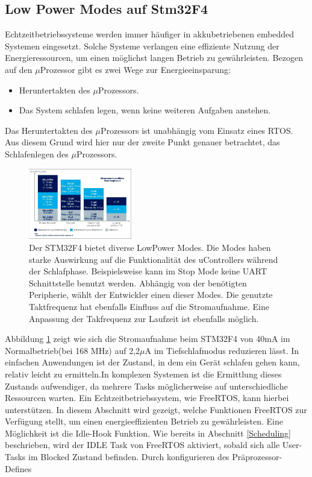 \subsection{Low Power Modes auf Stm32F4}
\label{sec:Low Power Modes}
Echtzeitbetriebssysteme werden immer häufiger in akkubetriebenen embedded Systemen eingesetzt. Solche Systeme verlangen eine effiziente Nutzung der Energieressourcen, um einen möglichst langen Betrieb zu ge\-währ\-leis\-ten. Bezogen auf den $\mu$\-Pro\-zesso\-r gibt es zwei Wege zur Energieeinsparung:
\begin{itemize}
	\item Heruntertakten des $\mu$\-Pro\-zesso\-rs.
	\item Das System schlafen legen, wenn keine weiteren Aufgaben anstehen.
\end{itemize}
Das Heruntertakten des $\mu$\-Pro\-zesso\-rs ist unabhängig vom Einsatz eines RTOS. Aus diesem Grund wird hier nur der zweite Punkt genauer betrachtet, das Schlafenlegen des $\mu$\-Pro\-zesso\-rs. 
\begin{figure}[htb!]
	\centering
		\includegraphics[width=0.4\textwidth]{Pictures/STM32F4/powerConsumption.png}
	\caption{Der STM32F4 bietet diverse LowPower Modes. Die Modes haben starke Auswirkung auf die Funktionalität des uControllers während der Schlafphase. Beispielsweise kann im Stop Mode keine UART Schnittstelle benutzt werden. Abhängig von der benötigten Peripherie, wählt der Entwickler einen dieser Modes. Die genutzte Taktfrequenz hat ebenfalls Einfluss auf die Stromaufnahme. Eine Anpassung der Takfrequenz zur Laufzeit ist ebenfalls möglich.}
	\label{fig:powerconsum}
\end{figure}
Abbildung \ref{fig:powerconsum} zeigt wie sich die Stromaufnahme beim STM32F4 von 40mA im Normalbetrieb(bei 168 MHz) auf 2,2$\mu$A im Tiefschlafmodus reduzieren lässt. 
In einfachen Anwendungen ist der Zustand, in dem ein Gerät schlafen gehen kann, relativ leicht zu ermitteln.\newline In komplexen Systemen ist die Ermittlung dieses Zustands aufwendiger, da mehrere Tasks mög\-li\-cherweise auf unterschiedliche Ressourcen warten. Ein Echtzeitbetriebssystem, wie FreeRTOS, kann hierbei unterstützen. In diesem Abschnitt wird gezeigt, welche Funktionen FreeRTOS zur Ver\-fü\-gung stellt, um einen energieeffizienten Betrieb zu ge\-währ\-leis\-ten. Eine Mög\-lich\-keit ist die Idle-Hook Funktion. Wie bereits in Abschnitt \ref{Scheduling} beschrieben, wird der IDLE Task von FreeRTOS aktiviert, sobald sich alle User-Tasks im Blocked Zustand befinden. Durch konfigurieren des Präprozessor-Defines        
